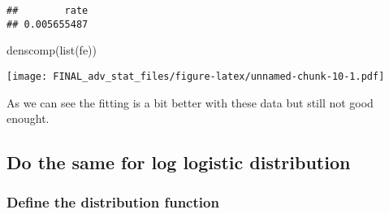 \documentclass[
]{article}
\newenvironment{Shaded}{\begin{snugshade}}{\end{snugshade}}
\newcommand{\FunctionTok}[1]{\textcolor[rgb]{0.00,0.00,0.00}{#1}}
\newcommand{\NormalTok}[1]{#1}
\newcommand{\OtherTok}[1]{\textcolor[rgb]{0.56,0.35,0.01}{#1}}
\newcommand{\SpecialCharTok}[1]{\textcolor[rgb]{0.00,0.00,0.00}{#1}}
\newcommand{\StringTok}[1]{\textcolor[rgb]{0.31,0.60,0.02}{#1}}
\begin{document}
\begin{Shaded}
\end{Shaded}

\begin{verbatim}
##        rate 
## 0.005655487
\end{verbatim}

\begin{Shaded}
\begin{Highlighting}[]
\FunctionTok{denscomp}\NormalTok{(}\FunctionTok{list}\NormalTok{(fe))}
\end{Highlighting}
\end{Shaded}

\texttt{[image: FINAL\_adv\_stat\_files/figure-latex/unnamed-chunk-10-1.pdf]}

As we can see the fitting is a bit better with these data but still not
good enought.

\hypertarget{do-the-same-for-log-logistic-distribution}{%
\subsection{Do the same for log logistic
distribution}\label{do-the-same-for-log-logistic-distribution}}

\hypertarget{define-the-distribution-function}{%
\subsubsection{Define the distribution
function}\label{define-the-distribution-function}}
\end{document}
